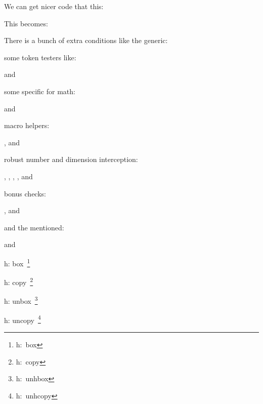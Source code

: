 \stoptitle

\starttitle[title=Conditionals]

We can get nicer code that this:

\starttyping
\ifdim\scratchdimen=10pt
   \expandafter\one
\else\ifnum\scratchcounter=20
   \expandafter\expandafter\expandafter\two
\else
   \expandafter\expandafter\expandafter\three
\fi\fi
\stoptyping

This becomes:

\starttyping
\ifdim\scratchdimen=10pt
   \expandafter\one
\orelse\ifnum\scratchcounter=20
   \expandafter\two
\else
   \expandafter\three
\fi
\stoptyping

\page

There is a bunch of extra conditions like the generic:

\startnarrower \type {\ifcondition} \stopnarrower

some token testers like:

\startnarrower \type {\iftok} and  \stopnarrower

some specific for math:

\startnarrower \type {\ifmathstyle} and \type {\ifmathparameter} \stopnarrower

macro helpers:

\startnarrower \type {\ifarguments}, \type {\ifboolean} and \type {\ifempty} \stopnarrower

robust number and dimension interception:

\startnarrower \type {\ifchknum}, \type {\ifchkdim}, \type {\ifcmpnum}, \type {\ifcmpdim)}, \type {\ifnumval} and \type {\ifdimval} \stopnarrower

bonus checks:

\startnarrower \type {\iffrozen}, \type {\ifprotected} and \type {\ifusercmd} \stopnarrower

and the mentioned:

\startnarrower \type {\orelse} and \type {\orunless} \stopnarrower

\stoptitle

\starttitle[title=Migration]

\startbuffer
h: \hbox{box    \footnote{h:     box}}\hbox{}\par
h: \hbox{copy   \footnote{h:    copy}}\hbox{}\par
h: \hbox{unbox  \footnote{h:  unhbox}}\hbox{}\par
h: \hbox{uncopy \footnote{h: unhcopy}}\hbox{}\par

